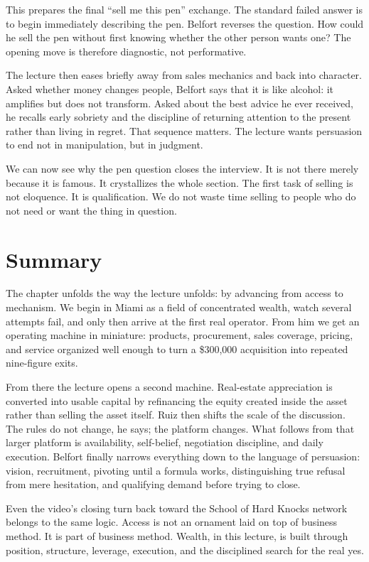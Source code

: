 This prepares the final ``sell me this pen'' exchange. The standard failed answer is to begin immediately describing the pen. Belfort reverses the question. How could he sell the pen without first knowing whether the other person wants one? The opening move is therefore diagnostic, not performative.

The lecture then eases briefly away from sales mechanics and back into character. Asked whether money changes people, Belfort says that it is like alcohol: it amplifies but does not transform. Asked about the best advice he ever received, he recalls early sobriety and the discipline of returning attention to the present rather than living in regret. That sequence matters. The lecture wants persuasion to end not in manipulation, but in judgment.

We can now see why the pen question closes the interview. It is not there merely because it is famous. It crystallizes the whole section. The first task of selling is not eloquence. It is qualification. We do not waste time selling to people who do not need or want the thing in question.

\section{Summary}

The chapter unfolds the way the lecture unfolds: by advancing from access to mechanism. We begin in Miami as a field of concentrated wealth, watch several attempts fail, and only then arrive at the first real operator. From him we get an operating machine in miniature: products, procurement, sales coverage, pricing, and service organized well enough to turn a \$300{,}000 acquisition into repeated nine-figure exits.

From there the lecture opens a second machine. Real-estate appreciation is converted into usable capital by refinancing the equity created inside the asset rather than selling the asset itself. Ruiz then shifts the scale of the discussion. The rules do not change, he says; the platform changes. What follows from that larger platform is availability, self-belief, negotiation discipline, and daily execution. Belfort finally narrows everything down to the language of persuasion: vision, recruitment, pivoting until a formula works, distinguishing true refusal from mere hesitation, and qualifying demand before trying to close.

Even the video's closing turn back toward the School of Hard Knocks network belongs to the same logic. Access is not an ornament laid on top of business method. It is part of business method. Wealth, in this lecture, is built through position, structure, leverage, execution, and the disciplined search for the real yes.